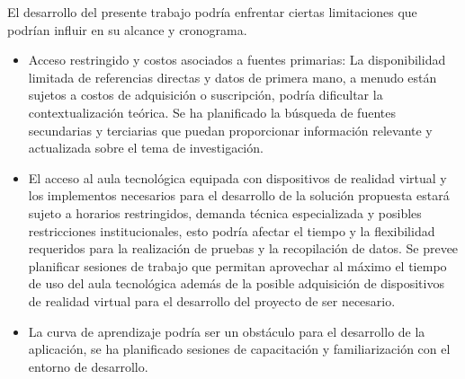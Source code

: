 
El desarrollo del presente trabajo podría enfrentar ciertas limitaciones que podrían influir en su alcance y cronograma.

\begin{itemize}
  \item Acceso restringido y costos asociados a fuentes primarias: La disponibilidad limitada de referencias directas y datos de primera mano, a menudo están sujetos a costos de adquisición o suscripción, podría dificultar la contextualización teórica. Se ha planificado la búsqueda de fuentes secundarias y terciarias que puedan proporcionar información relevante y actualizada sobre el tema de investigación.
  \item El acceso al aula tecnológica equipada con dispositivos de realidad virtual y los implementos necesarios para el desarrollo de la solución propuesta estará sujeto a horarios restringidos, demanda técnica especializada y posibles restricciones institucionales, esto podría afectar el tiempo y la flexibilidad requeridos para la realización de pruebas y la recopilación de datos. Se prevee planificar sesiones de trabajo que permitan aprovechar al máximo el tiempo de uso del aula tecnológica además de la posible adquisición de dispositivos de realidad virtual para el desarrollo del proyecto de ser necesario.
  \item La curva de aprendizaje podría ser un obstáculo para el desarrollo de la aplicación, se ha planificado sesiones de capacitación y familiarización con el entorno de desarrollo.
\end{itemize}

\clearpage
